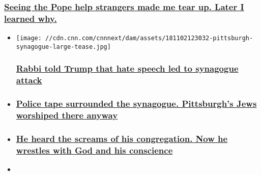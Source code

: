 \begin{itemize}
{  \subsubsection{\texorpdfstring{\href{/2018/04/06/europe/pope-elevation/index.html}{Seeing
  the Pope help strangers made me tear up. Later I learned why.
  }}{Seeing the Pope help strangers made me tear up. Later I learned why. }}\label{seeing-the-pope-help-strangers-made-me-tear-up-later-i-learned-why-}}
\end{itemize}

\begin{itemize}
\item
  \href{/2018/11/03/us/pittsburgh-shooting-first-shabbat/index.html}{}

  \texttt{[image: //cdn.cnn.com/cnnnext/dam/assets/181102123032-pittsburgh-synagogue-large-tease.jpg]}

  \hypertarget{rabbi-told-trump-that-hate-speech-led-to-synagogue-attack}{%
  \subsubsection{\texorpdfstring{\href{/2018/11/03/us/pittsburgh-shooting-first-shabbat/index.html}{Rabbi
  told Trump that hate speech led to synagogue
  attack}}{Rabbi told Trump that hate speech led to synagogue attack}}\label{rabbi-told-trump-that-hate-speech-led-to-synagogue-attack}}
\item
  \hypertarget{police-tape-surrounded-the-synagogue-pittsburghs-jews-worshiped-there-anyway}{%
  \subsubsection{\texorpdfstring{\href{/2018/11/02/us/pittsburgh-shooting-first-shabbat/index.html}{Police
  tape surrounded the synagogue. Pittsburgh's Jews worshiped there
  anyway}}{Police tape surrounded the synagogue. Pittsburgh's Jews worshiped there anyway}}\label{police-tape-surrounded-the-synagogue-pittsburghs-jews-worshiped-there-anyway}}
\item
  \hypertarget{he-heard-the-screams-of-his-congregation-now-he-wrestles-with-god-and-his-conscience}{%
  \subsubsection{\texorpdfstring{\href{/2018/11/02/us/rabbi-myers-profile/index.html}{He
  heard the screams of his congregation. Now he wrestles with God and
  his
  conscience}}{He heard the screams of his congregation. Now he wrestles with God and his conscience}}\label{he-heard-the-screams-of-his-congregation-now-he-wrestles-with-god-and-his-conscience}}
\item
  \hypertarget{american-jews-have-feared-this-kind-of-attack-for-years-but-still-kept-their-doors-open-heres-why}{%
}
\end{itemize}
